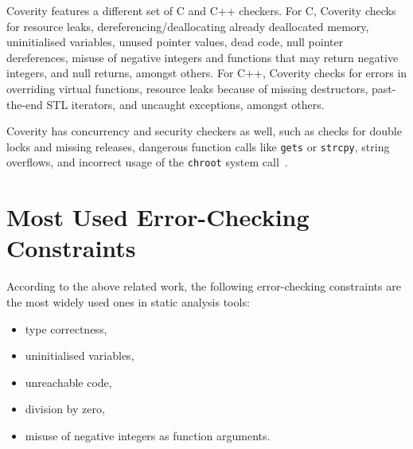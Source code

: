 Coverity features a different set of C and C++ checkers. For C, Coverity checks for resource leaks, dereferencing/deallocating already deallocated memory, uninitialised variables, unused pointer values, dead code, null pointer dereferences, misuse of negative integers and functions that may return negative integers, and null returns, amongst others. For C++, Coverity checks for errors in overriding virtual functions, resource leaks because of missing destructors, past-the-end STL iterators, and uncaught exceptions, amongst others.

Coverity has concurrency and security checkers as well, such as checks for double locks and missing releases, dangerous function calls like \texttt{gets} or \texttt{strcpy}, string overflows, and incorrect usage of the \texttt{chroot} system call~\cite{emanuelsson2008comparative}.


\section{Most Used Error-Checking Constraints}

According to the above related work, the following error-checking constraints are the most widely used ones in static analysis tools:

\begin{itemize}
\item type correctness,
\item uninitialised variables,
\item unreachable code,
\item division by zero,
\item misuse of negative integers as function arguments.
\end{itemize}
